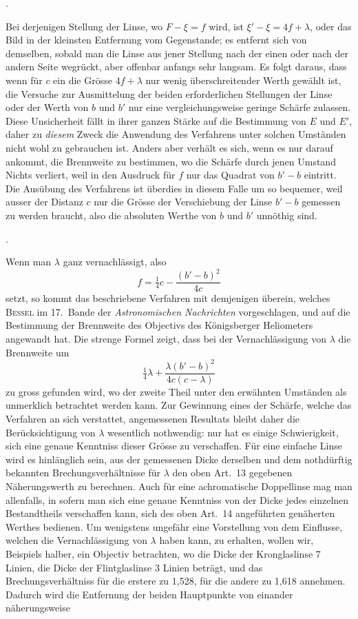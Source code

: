 \documentclass[11pt,a4paper]{article}
\begin{document}
\bigskip{}.

\smallskip
Bei derjenigen Stellung der Linse, wo $F - \xi = f$ wird, ist $\xi' - \xi = 4f + \lambda$, oder das Bild in der kleinsten Entfernung vom Gegenstande; es entfernt sich von demselben, sobald man die Linse aus jener Stellung nach der einen oder nach der andern Seite wegrückt, aber offenbar anfangs sehr langsam. Es folgt daraus, dass wenn für $c$ ein die Grösse $4f + \lambda$ nur wenig überschreitender Werth gewählt ist, die Versuche zur Ausmittelung der beiden erforderlichen Stellungen der Linse oder der Werth von $b$ und $b'$ nur eine vergleichungsweise geringe Schärfe zulassen. Diese Unsicherheit fällt in ihrer ganzen Stärke auf die Bestimmung von $E$ und $E'$, daher zu \textit{diesem} Zweck die Anwendung des Verfahrens unter solchen Umständen nicht wohl zu gebrauchen ist. Anders aber verhält es sich, wenn es nur darauf ankommt, die Brennweite zu bestimmen, wo die Schärfe durch jenen Umstand Nichts verliert, weil in den Ausdruck für $f$ nur das Quadrat von $b' - b$ eintritt. Die Ausübung des Verfahrens ist überdies in diesem Falle um so bequemer, weil ausser der Distanz $c$ nur die Grösse der Verschiebung der Linse $b' - b$ gemessen zu werden braucht, also die absoluten Werthe von $b$ und $b'$ unnöthig sind.

\bigskip{}.

\smallskip
Wenn man $\lambda$ ganz vernachlässigt, also
\[
f = \tfrac14 c - \frac{(b' - b)^2}{4c}
\]
setzt, so kommt das beschriebene Verfahren mit demjenigen überein, welches \textsc{Bessel} im 17.~Bande der \textit{Astronomischen Nachrichten} vorgeschlagen, und auf die Bestimmung der Brennweite des Objectivs des Königsberger Heliometers angewandt hat. Die strenge Formel zeigt, dass bei der Vernachlässigung von $\lambda$ die Brennweite um
\[
\tfrac14\lambda + \frac{\lambda(b' - b)^2}{4c(c - \lambda)}
\]
zu gross gefunden wird, wo der zweite Theil unter den erwähnten Umständen als unmerklich betrachtet werden kann. Zur Gewinnung eines der Schärfe, welche das Verfahren an sich verstattet, angemessenen Resultats bleibt daher die Berücksichtigung von $\lambda$ wesentlich nothwendig: nur hat es einige Schwierigkeit, sich eine genaue Kenntniss dieser Grösse zu verschaffen. Für eine einfache Linse wird es hinlänglich sein, aus der gemessenen Dicke derselben und dem nothdürftig bekannten Brechungsverhältnisse für $\lambda$ den oben Art.~13 gegebenen Näherungswerth zu berechnen. Auch für eine achromatische Doppellinse mag man allenfalls, in sofern man sich eine genaue Kenntniss von der Dicke jedes einzelnen Bestandtheils verschaffen kann, sich des oben Art.~14 angeführten genäherten Werthes bedienen. Um wenigstens ungefähr eine Vorstellung von dem Einflusse, welchen die Vernachlässigung von $\lambda$ haben kann, zu erhalten, wollen wir, Beispiels halber, ein Objectiv betrachten, wo die Dicke der Kronglaslinse 7 Linien, die Dicke der Flintglaslinse 3 Linien beträgt, und das Brechungsverhältniss für die erstere zu 1,528, für die andere zu 1,618 annehmen. Dadurch wird die Entfernung der beiden Hauptpunkte von einander näherungsweise
\end{document}
